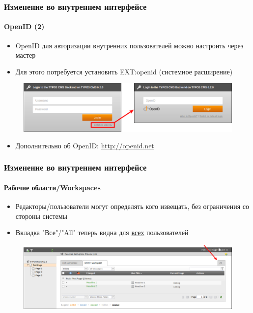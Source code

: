 
\begin{frame}[fragile]
	\frametitle{Изменение во внутреннем интерфейсе}
	\framesubtitle{OpenID (2)}

 	\begin{itemize}
		\item OpenID для авторизации внутренних пользователей можно настроить через мастер
		\item Для этого потребуется установить EXT:openid (системное расширение)
	\end{itemize}

	\begin{figure}
		\includegraphics[width=0.8\linewidth]{Images/BackendChanges/OpenIdLogin.png}
	\end{figure}

 	\begin{itemize}
		\item Дополнительно об OpenID:\newline
			\small\url{http://openid.net}\normalsize
	\end{itemize}


\end{frame}


\begin{frame}[fragile]
	\frametitle{Изменение во внутреннем интерфейсе}
	\framesubtitle{Рабочие области/Workspaces}

 	\begin{itemize}
		\item Редакторы/пользователи могут определять кого извещать, без ограничения со стороны системы
		\item Вкладка "Все"/"All" теперь видна для \underline{всех} пользователей
	\end{itemize}

	\begin{figure}
		\includegraphics[width=0.95\linewidth]{Images/BackendChanges/WorkspacesTabAll.png}
	\end{figure}

\end{frame}


